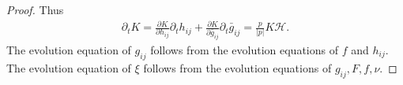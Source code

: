 \documentclass{amsart}
\theoremstyle{definition}
\theoremstyle{remark}
\numberwithin{equation}{section}
\begin{document}
\begin{proof}
Thus
\begin{align*}
\partial_t K=\frac{\partial K}{\partial h_{ij}}\partial_th_{ij}+\frac{\partial K}{\partial \bar{g}_{ij}}\partial_t\bar{g}_{ij}=\frac{p}{|p|}K\mathcal{H}.
\end{align*}
The evolution equation of $g_{ij}$ follows from the evolution equations of $ f $ and $h_{ij}.$ The evolution equation of $\xi$ follows from the evolution equations of $g_{ij}, F,  f ,\nu.$ %
\end{proof}
\end{document}
